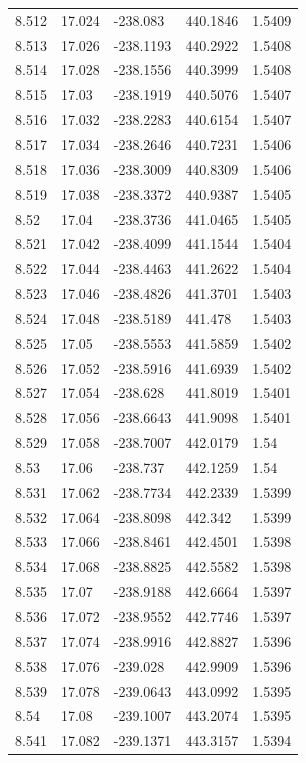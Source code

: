 \begin{tabular}{lllll}
8.512 & 17.024 & -238.083 & 440.1846 & 1.5409 \\
8.513 & 17.026 & -238.1193 & 440.2922 & 1.5408 \\
8.514 & 17.028 & -238.1556 & 440.3999 & 1.5408 \\
8.515 & 17.03 & -238.1919 & 440.5076 & 1.5407 \\
8.516 & 17.032 & -238.2283 & 440.6154 & 1.5407 \\
8.517 & 17.034 & -238.2646 & 440.7231 & 1.5406 \\
8.518 & 17.036 & -238.3009 & 440.8309 & 1.5406 \\
8.519 & 17.038 & -238.3372 & 440.9387 & 1.5405 \\
8.52 & 17.04 & -238.3736 & 441.0465 & 1.5405 \\
8.521 & 17.042 & -238.4099 & 441.1544 & 1.5404 \\
8.522 & 17.044 & -238.4463 & 441.2622 & 1.5404 \\
8.523 & 17.046 & -238.4826 & 441.3701 & 1.5403 \\
8.524 & 17.048 & -238.5189 & 441.478 & 1.5403 \\
8.525 & 17.05 & -238.5553 & 441.5859 & 1.5402 \\
8.526 & 17.052 & -238.5916 & 441.6939 & 1.5402 \\
8.527 & 17.054 & -238.628 & 441.8019 & 1.5401 \\
8.528 & 17.056 & -238.6643 & 441.9098 & 1.5401 \\
8.529 & 17.058 & -238.7007 & 442.0179 & 1.54 \\
8.53 & 17.06 & -238.737 & 442.1259 & 1.54 \\
8.531 & 17.062 & -238.7734 & 442.2339 & 1.5399 \\
8.532 & 17.064 & -238.8098 & 442.342 & 1.5399 \\
8.533 & 17.066 & -238.8461 & 442.4501 & 1.5398 \\
8.534 & 17.068 & -238.8825 & 442.5582 & 1.5398 \\
8.535 & 17.07 & -238.9188 & 442.6664 & 1.5397 \\
8.536 & 17.072 & -238.9552 & 442.7746 & 1.5397 \\
8.537 & 17.074 & -238.9916 & 442.8827 & 1.5396 \\
8.538 & 17.076 & -239.028 & 442.9909 & 1.5396 \\
8.539 & 17.078 & -239.0643 & 443.0992 & 1.5395 \\
8.54 & 17.08 & -239.1007 & 443.2074 & 1.5395 \\
8.541 & 17.082 & -239.1371 & 443.3157 & 1.5394 \\

\end{tabular}
